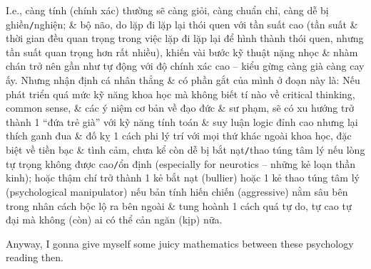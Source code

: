 \documentclass[12pt,twoside]{book}
\begin{document}
I.e., càng tính (chính xác) thường sẽ càng giỏi, càng chuẩn chỉ, càng dễ bị ghiền{\tt/}nghiện; \& bộ não, do lặp đi lặp lại thói quen với tần suất cao (tần suất \& thời gian đều quan trọng trong việc lặp đi lặp lại để hình thành thói quen, nhưng tần suất quan trọng hơn rất nhiều), khiến vài bước kỹ thuật nặng nhọc \& nhàm chán trở nên gần như tự động với độ chính xác cao -- kiểu gừng càng già càng cay ấy. Nhưng nhận định cá nhân thẳng \& có phần gắt của mình ở đoạn này là: Nếu phát triển quá mức kỹ năng khoa học mà không biết tí nào về critical thinking, common sense, \& các ý niệm cơ bản về đạo đức \& sư phạm, sẽ có xu hướng trở thành 1 ``đứa trẻ già'' với kỹ năng tính toán \& suy luận logic đỉnh cao nhưng lại thích ganh đua \& đố kỵ 1 cách phi lý trí với mọi thứ khác ngoài khoa học, đặc biệt về tiền bạc \& tình cảm, chưa kể còn dễ bị bắt nạt{\tt/}thao túng tâm lý nếu lòng tự trọng không được cao{\tt/}ổn định (especially for neurotics -- những kẻ loạn thần kinh); hoặc thậm chí trở thành 1 kẻ bắt nạt (bullier) hoặc 1 kẻ thao túng tâm lý (psychological manipulator) nếu bản tính hiến chiến (aggressive) nằm sâu bên trong nhân cách bộc lộ ra bên ngoài \& tung hoành 1 cách quá tự do, tự cao tự đại mà không (còn) ai có thể cản ngăn (kịp) nữa.

Anyway, I gonna give myself some juicy mathematics between these psychology reading then.
\end{document}
